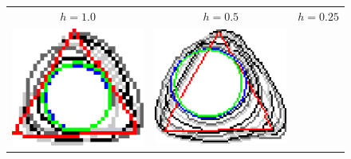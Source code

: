 \begin{figure}[hp!]
	\center
	\begin{tabular}{ccc}
		$h=1.0$ & $h=0.5$ & $h=0.25$ \\[2em]
	\includegraphics[scale=0.185]{figures/chapter5/flow/triangle/radius_5/ii/elastica/len_pen_0.01000/jonctions_1/best/gs_1.00000/summary.pdf} &
	\includegraphics[scale=0.185]{figures/chapter5/flow/triangle/radius_5/ii/elastica/len_pen_0.01000/jonctions_1/best/gs_0.50000/summary.pdf} &

\end{tabular}
\end{figure}

